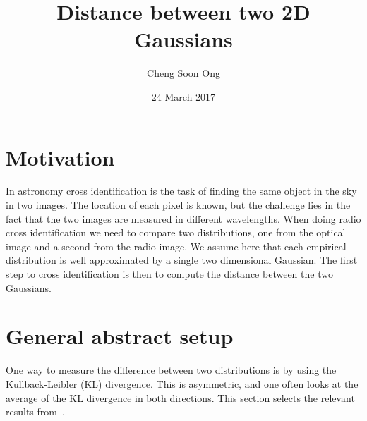\documentclass[a4paper]{article}
\title{Distance between two 2D Gaussians}
\author{Cheng Soon Ong}
\date{24 March 2017}
\begin{document}
\maketitle

\section{Motivation}

In astronomy cross identification is the task of finding the same object in the sky in two images.
The location of each pixel is known, but the challenge lies in the fact that the two images are
measured in different wavelengths.
When doing radio cross identification we need to compare two distributions, one from the optical
image and a second from the radio image.
We assume here that each empirical distribution is well approximated by a single two dimensional
Gaussian.
The first step to cross identification is then to compute the distance between the two Gaussians.

\section{General abstract setup}

One way to measure the difference between two distributions is by using the Kullback-Leibler (KL)
divergence. This is asymmetric, and one often looks at the average of the KL divergence in
both directions. This section selects the relevant results
from~\cite{nielsen09clumnd,nielsen11staefd}.
\end{document}
